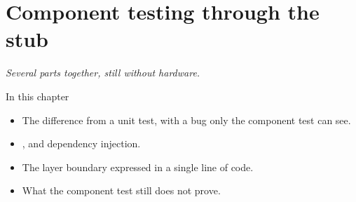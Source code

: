 \chapter{Component testing through the stub}
\label{ch:komponent}


{\large\itshape Several parts together, still without hardware.\par}

\begin{chapterbox}{In this chapter}
\begin{itemize}
  \item The difference from a unit test, with a bug only the component test can see.
  \item {}, and dependency injection.
  \item The layer boundary expressed in a single line of code.
  \item What the component test still does not prove.
\end{itemize}
\end{chapterbox}




